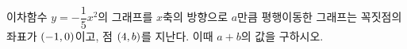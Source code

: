 이차함수 $y=-\dfrac{1}{5}x^2$의 그래프를 $x$축의 방향으로 $a$만큼 평행이동한 그래프는 꼭짓점의 좌표가 $(-1{,}\mkern3mu 0)$이고, 점 $(4{,}\mkern3mu b)$를 지난다. 이때 $a+b$의 값을 구하시오.
